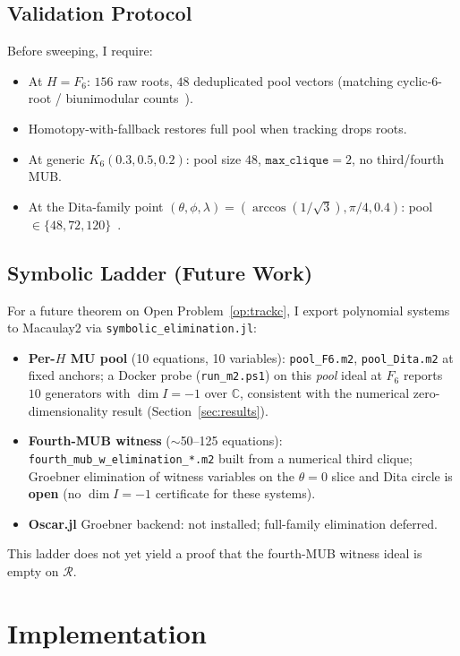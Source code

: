 \documentclass[onecolumn]{IEEEtran}
\newcommand{\repo}[1]{{\ttfamily\nolinkurl{#1}}}
\begin{document}
\subsection{Validation Protocol}
Before sweeping, I require:
\begin{itemize}
    \item[\textbf{V1}] At $H=F_6$: $156$ raw roots, $48$ deduplicated pool vectors (matching cyclic-6-root / biunimodular counts~\cite{Haagerup2001, Bjork2015}).
    \item[\textbf{V2}] Homotopy-with-fallback restores full pool when tracking drops roots.
    \item[\textbf{V3}] At generic $K_6(0.3,0.5,0.2)$: pool size $48$, $\texttt{max\_clique}=2$, no third/fourth MUB.
    \item[\textbf{V4}] At the Dita-family point $(\theta,\phi,\lambda)=(\arccos(1/\sqrt{3}),\pi/4,0.4)$: pool $\in\{48,72,120\}$~\cite{Brierley2009}.
\end{itemize}

\subsection{Symbolic Ladder (Future Work)}
\label{sec:symbolic}
For a future theorem on Open Problem~\ref{op:trackc}, I export polynomial systems to Macaulay2 via \repo{symbolic_elimination.jl}:
\begin{itemize}
    \item \textbf{Per-$H$ MU pool} (10 equations, 10 variables): \texttt{pool\_F6.m2}, \texttt{pool\_Dita.m2} at fixed anchors; a Docker probe (\texttt{run\_m2.ps1}) on this \emph{pool} ideal at $F_6$ reports $10$ generators with $\dim I=-1$ over $\mathbb{C}$, consistent with the numerical zero-dimensionality result (Section~\ref{sec:results}).
    \item \textbf{Fourth-MUB witness} ($\sim$50--125 equations): \texttt{fourth\_mub\_w\_elimination\_*.m2} built from a numerical third clique; Groebner elimination of witness variables on the $\theta{=}0$ slice and Dita circle is \textbf{open} (no $\dim I=-1$ certificate for these systems).
    \item \textbf{Oscar.jl} Groebner backend: not installed; full-family elimination deferred.
\end{itemize}
This ladder does not yet yield a proof that the fourth-MUB witness ideal is empty on $\mathcal{R}$.

\section{Implementation}
\label{sec:impl}
\end{document}
